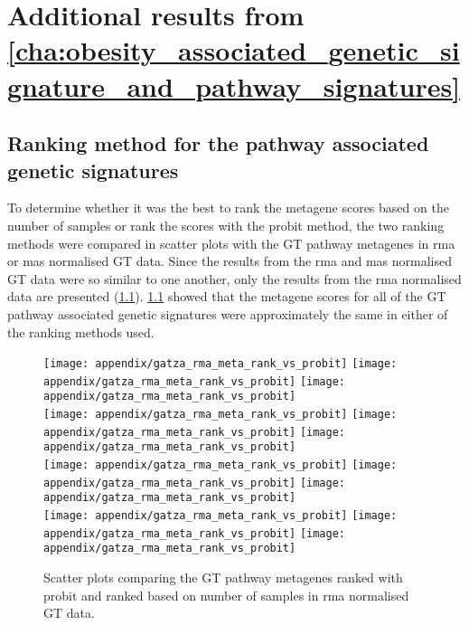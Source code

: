 	\chapter{Additional results from \cref{cha:obesity_associated_genetic_signature_and_pathway_signatures}}
	\label{app:b}

	\section{Ranking method for the pathway associated genetic signatures}
	\label{sec:ranking_method_for_the_pathway_associated_genetic_signatures}

	To determine whether it was the best to rank the metagene scores based on the number of samples or rank the scores with the probit method, the two ranking methods were compared in scatter plots with the GT pathway metagenes in \gls{rma} or \gls{mas} normalised GT data.
	Since the results from the \gls{rma} and \gls{mas} normalised GT data were so similar to one another, only the results from the \gls{rma} normalised data are presented (\cref{fig:appendix/rank_scatter}).
	\cref{fig:appendix/rank_scatter} showed that the metagene scores for all of the GT pathway associated genetic signatures were approximately the same in either of the ranking methods used.

	\begin{figure}[htp!]
		\centering
		\texttt{[image: appendix/gatza\_rma\_meta\_rank\_vs\_probit]}
		\texttt{[image: appendix/gatza\_rma\_meta\_rank\_vs\_probit]}
		\texttt{[image: appendix/gatza\_rma\_meta\_rank\_vs\_probit]}\\
		\texttt{[image: appendix/gatza\_rma\_meta\_rank\_vs\_probit]}
		\texttt{[image: appendix/gatza\_rma\_meta\_rank\_vs\_probit]}
		\texttt{[image: appendix/gatza\_rma\_meta\_rank\_vs\_probit]}\\
		\texttt{[image: appendix/gatza\_rma\_meta\_rank\_vs\_probit]}
		\texttt{[image: appendix/gatza\_rma\_meta\_rank\_vs\_probit]}
		\texttt{[image: appendix/gatza\_rma\_meta\_rank\_vs\_probit]}\\
		\texttt{[image: appendix/gatza\_rma\_meta\_rank\_vs\_probit]}
		\texttt{[image: appendix/gatza\_rma\_meta\_rank\_vs\_probit]}
		\texttt{[image: appendix/gatza\_rma\_meta\_rank\_vs\_probit]}\\
		\caption[]{Scatter plots comparing the GT pathway metagenes ranked with probit and ranked based on number of samples in \gls{rma} normalised GT data. }
		\label{fig:appendix/rank_scatter}
	\end{figure}

